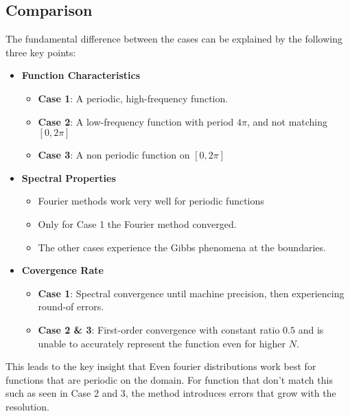 \subsection{Comparison}
%
%
%
%
%
%
%
%
The fundamental difference between the cases can be explained by the following three key points:
\begin{itemize}
	\item \textbf{Function Characteristics}
	      \begin{itemize}
		      \item \textbf{Case 1}: A periodic, high-frequency function.
		      \item \textbf{Case 2}: A low-frequency function with period $4\pi$, and not matching $[0, 2\pi]$
		      \item \textbf{Case 3}: A non periodic function on $[0, 2 \pi]$
	      \end{itemize}
	\item \textbf{Spectral Properties}
	      \begin{itemize}
		      \item Fourier methods work very well for periodic functions
		      \item Only for Case 1 the Fourier method converged.
		      \item The other cases experience the Gibbs phenomena at the boundaries.
	      \end{itemize}

	\item \textbf{Covergence Rate}
	      \begin{itemize}
		      \item \textbf{Case 1}: Spectral convergence until machine precision, then experiencing round-of errors.
		      \item \textbf{Case 2 \& 3}: First-order convergence with constant ratio $0.5$ and is unable to accurately represent the function even for higher $N$.
	      \end{itemize}
\end{itemize}
This leads to the key insight that Even fourier distributions work best for functions that are periodic on the domain. For function that don't match this such as seen in Case 2 and 3, the method introduces errors that grow with the resolution.

